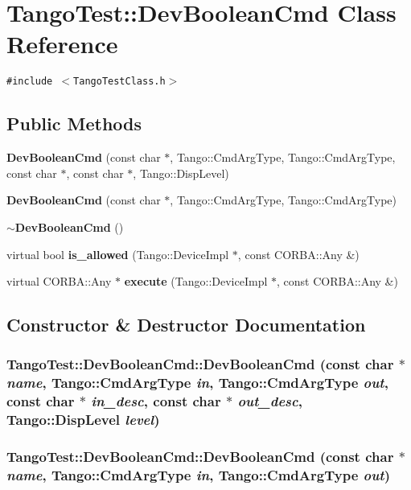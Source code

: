 \section{Tango\-Test::Dev\-Boolean\-Cmd  Class Reference}
\label{classTangoTest_1_1DevBooleanCmd}
{\tt \#include $<$Tango\-Test\-Class.h$>$}

\subsection*{Public Methods}
\begin{CompactItemize}
\item 
{\bf Dev\-Boolean\-Cmd} (const char $\ast$, Tango::Cmd\-Arg\-Type, Tango::Cmd\-Arg\-Type, const char $\ast$, const char $\ast$, Tango::Disp\-Level)
\item 
{\bf Dev\-Boolean\-Cmd} (const char $\ast$, Tango::Cmd\-Arg\-Type, Tango::Cmd\-Arg\-Type)
\item 
{\bf $\sim$Dev\-Boolean\-Cmd} ()
\item 
virtual bool {\bf is\_\-allowed} (Tango::Device\-Impl $\ast$, const CORBA::Any \&)
\item 
virtual CORBA::Any $\ast$ {\bf execute} (Tango::Device\-Impl $\ast$, const CORBA::Any \&)
\end{CompactItemize}


\subsection{Constructor \& Destructor Documentation}
\subsubsection{\setlength{\rightskip}{0pt plus 5cm}Tango\-Test::Dev\-Boolean\-Cmd::Dev\-Boolean\-Cmd (const char $\ast$ {\em name}, Tango::Cmd\-Arg\-Type {\em in}, Tango::Cmd\-Arg\-Type {\em out}, const char $\ast$ {\em in\_\-desc}, const char $\ast$ {\em out\_\-desc}, Tango::Disp\-Level {\em level})}\label{classTangoTest_1_1DevBooleanCmd_a0}


\subsubsection{\setlength{\rightskip}{0pt plus 5cm}Tango\-Test::Dev\-Boolean\-Cmd::Dev\-Boolean\-Cmd (const char $\ast$ {\em name}, Tango::Cmd\-Arg\-Type {\em in}, Tango::Cmd\-Arg\-Type {\em out})}\label{classTangoTest_1_1DevBooleanCmd_a1}


